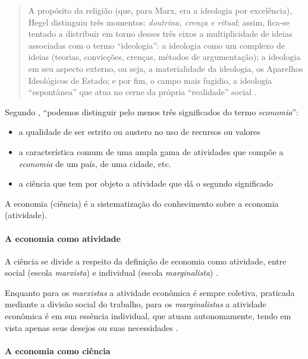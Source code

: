 \documentclass[]{article}
\providecommand{\tightlist}{%
  \setlength{\itemsep}{0pt}\setlength{\parskip}{0pt}}
\let\oldparagraph\paragraph
\renewcommand{\paragraph}[1]{\oldparagraph{#1}\mbox{}}
\begin{document}
\begin{quote}
A propósito da religião (que, para Marx, era a ideologia por
excelência), Hegel distinguiu três momentos: \emph{doutrina, crença e
ritual}; assim, fica-se tentado a distribuir em torno desses três eixos
a multiplicidade de ideias associadas com o termo ``ideologia'': a
ideologia como um complexo de ideias (teorias, convicções, crenças,
métodos de argumentação); a ideologia em seu aspecto externo, ou seja, a
materialidade da ideologia, os Aparelhos Ideológicos de Estado; e por
fim, o campo mais fugidio, a ideologia ``espontânea'' que atua no cerne
da própria ``realidade'' social \cite[p.~15]{zizek}.
\end{quote}

Segundo , ``podemos distinguir pelo menos três
significados do termo \emph{economia}'':

\begin{itemize}
\tightlist
\item
  a qualidade de ser estrito ou austero no uso de recursos ou valores
\item
  a característica comum de uma ampla gama de atividades que compõe a
  \emph{economia} de um país, de uma cidade, etc.
\item
  a ciência que tem por objeto a atividade que dá o segundo significado
\end{itemize}

A economia (ciência) é a sistematização do conhecimento sobre a economia
(atividade).

\paragraph{A economia como atividade}\label{a-economia-como-atividade}

A ciência se divide a respeito da definição de economia como atividade,
entre social (escola \emph{marxista}) e individual (escola
\emph{marginalista}) \cite[p.~9]{singer}.

Enquanto para os \emph{marxistas} a atividade econômica é sempre
coletiva, praticada mediante a divisão social do trabalho, para os
\emph{marginalistas} a atividade econômica é em sua essência individual,
que atuam autonomamente, tendo em vista apenas seus desejos ou suas
necessidades \cite[p.~10]{singer}.

\paragraph{A economia como ciência}\label{a-economia-como-ciencia}
\end{document}
